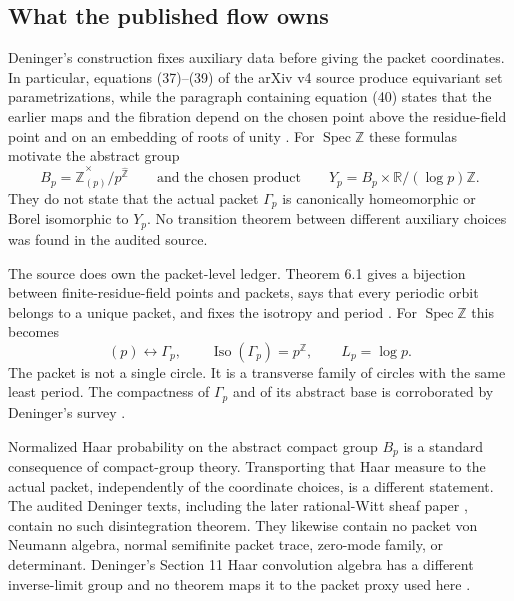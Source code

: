 \documentclass[11pt,a4paper]{article}
\theoremstyle{definition}
\newcommand{\R}{\mathbb R}
\newcommand{\Z}{\mathbb Z}
\newcommand{\Spec}{\operatorname{Spec}}
\newcommand{\whZ}{\widehat{\Z}}
\begin{document}
\subsection{What the published flow owns}

Deninger's construction fixes auxiliary data before giving the packet
coordinates.  In particular, equations (37)--(39) of the arXiv v4 source
produce equivariant set parametrizations, while the paragraph containing
equation (40) states that the earlier maps and the fibration depend on the
chosen point above the residue-field point and on an embedding of roots of
unity \citep[Section 5, equations (32), (35), and (37)--(40)]{Deninger2026}.
For $\Spec\Z$ these formulas motivate the abstract group
\begin{equation}
  B_p=\whZ_{(p)}^{\times}/p^{\whZ}
  \qquad\text{and the chosen product}\qquad
  Y_p=B_p\times \R/(\log p)\Z .
  \label{eq:BpYp}
\end{equation}
They do not state that the actual packet $\Gamma_p$ is canonically
homeomorphic or Borel isomorphic to $Y_p$.  No transition theorem between
different auxiliary choices was found in the audited source.

The source does own the packet-level ledger.  Theorem 6.1 gives a bijection
between finite-residue-field points and packets, says that every periodic
orbit belongs to a unique packet, and fixes the isotropy and period
\citep[Section 6, Theorem 6.1]{Deninger2026}.  For $\Spec\Z$ this becomes
\begin{equation}
  (p)\longleftrightarrow \Gamma_p,
  \qquad \operatorname{Iso}(\Gamma_p)=p^{\Z},
  \qquad L_p=\log p .
  \label{eq:source-ledger}
\end{equation}
The packet is not a single circle.  It is a transverse family of circles with
the same least period.  The compactness of $\Gamma_p$ and of its abstract base
is corroborated by Deninger's survey \citep[Theorem 4.2]{Deninger2023}.

Normalized Haar probability on the abstract compact group $B_p$ is a standard
consequence of compact-group theory.  Transporting that Haar measure to the
actual packet, independently of the coordinate choices, is a different
statement.  The audited Deninger texts, including the later rational-Witt
sheaf paper \citep{Deninger2025Witt}, contain no such disintegration theorem.
They likewise contain no packet von Neumann algebra, normal semifinite packet
trace, zero-mode family, or determinant.  Deninger's Section 11 Haar
convolution algebra has a different inverse-limit group and no theorem maps
it to the packet proxy used here \citep[Section 11]{Deninger2026}.
\end{document}

